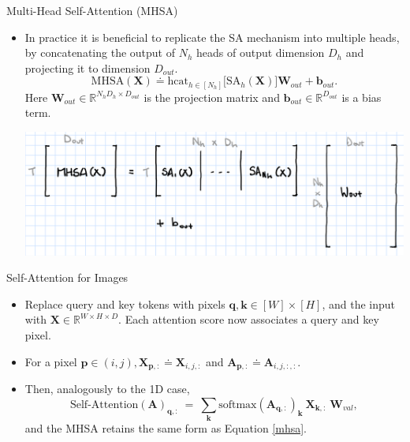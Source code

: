 \documentclass[9pt]{beamer}
\newcommand{\bb}{\mathbb}
\newcommand{\mb}{\bm}
\begin{document}
\begin{frame}{Multi-Head Self-Attention (MHSA)}
\begin{itemize}
\item In practice it is beneficial to replicate the SA mechanism into multiple heads, by concatenating the output of $N_h$ heads of output dimension $D_h$ and projecting it to dimension $D_{out}$.
\begin{equation}
\text{MHSA}(\mb X) \doteq \text{hcat}_{h\in[N_h]}\big[\text{SA}_h(\mb X)\big]\mb W_{out} + \mb b_{out}. \label{mhsa}
\end{equation}
Here $\bm W_{out}\in\bb R^{N_hD_h\times D_{out}}$ is the projection matrix and $\bm  b_{out}\in\bb R^{D_{out}}$ is a bias term.

\vspace{.2in}
\begin{center}
    \includegraphics[width=.7\textwidth]{images/mhsa.PNG}
\end{center}
\end{itemize}
\end{frame}


\begin{frame}{Self-Attention for Images}
\begin{itemize}
\item Replace query and key tokens with pixels $\bm q, \bm k \in [W]\times[H]$, and the input with $\bm X \in \bb R^{W\times H\times D}$. Each attention score now associates a query and key pixel. 

\item For a pixel $\bm p\in (i,j), \bm X_{\bm p,:} \doteq \bm X_{i,j,:}$ and $\bm A_{\bm p, :} \doteq \bm A_{i,j,:,:}$. 

\item Then, analogously to the 1D case,
\begin{equation}
\text{Self-Attention}(\mb A)_{\mb q, :} \ = \ \sum_{\mb k} \text{softmax}(\mb A_{\mb q, :})_{\mb k}\ \mb X_{\mb k, :} \ \mb W_{val},
\end{equation}
and the MHSA retains the same form as Equation \eqref{mhsa}.
\end{itemize}
\end{frame}
\end{document}

